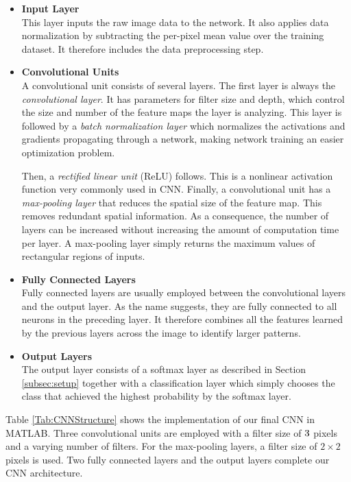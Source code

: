 \begin{itemize}
	
	\item \textbf{Input Layer}\\
	This layer inputs the raw image data to the network. It also applies data normalization by subtracting the per-pixel mean value over the training dataset. It therefore includes the data preprocessing step.
	
	\item \textbf{Convolutional Units}\\
	A convolutional unit consists of several layers. The first layer is always the \textit{convolutional layer}. It has parameters for filter size and depth, which control the size and number of the feature maps the layer is analyzing. This layer is followed by a \textit{batch normalization layer} which normalizes the activations and gradients propagating through a network, making network training an easier optimization problem.
	
	Then, a \textit{rectified linear unit} (ReLU) follows. This is a nonlinear activation function very commonly used in CNN. Finally, a convolutional unit has a \textit{max-pooling layer} that reduces the spatial size of the feature map. This removes redundant spatial information. As a consequence, the number of layers can be increased without increasing the amount of computation time per layer. A max-pooling layer simply returns the maximum values of rectangular regions of inputs.
	
	\item \textbf{Fully Connected Layers}\\
	Fully connected layers are usually employed between the convolutional layers and the output layer. As the name suggests, they are fully connected to all neurons in the preceding layer. It therefore combines all the features learned by the previous layers across the image to identify larger patterns.
	
	\item \textbf{Output Layers}\\
	The output layer consists of a softmax layer as described in Section \ref{subsec:setup} together with a classification layer which simply chooses the class that achieved the highest probability by the softmax layer.
	
\end{itemize}

Table \ref{Tab:CNNStructure} shows the implementation of our final CNN in MATLAB. Three convolutional units are employed with a filter size of $3\time3$ pixels and a varying number of filters. For the max-pooling layers, a filter size of $2\times2$ pixels is used. Two fully connected layers and the output layers complete our CNN architecture.
 
